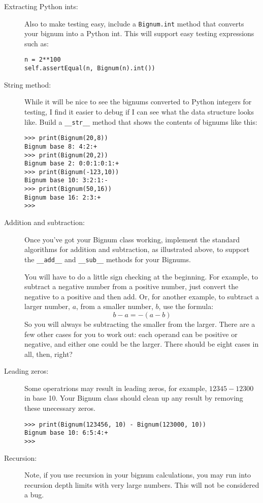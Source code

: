 \documentclass{article}
\begin{document}
\begin{description}
\item[Extracting Python ints:]
Also to make testing easy, include a \lstinline{Bignum.int} method that
converts your bignum into a Python int.  This will support easy testing
expressions such as:
\begin{lstlisting}
n = 2**100
self.assertEqual(n, Bignum(n).int())
\end{lstlisting}

\item[String method:]
While it will be nice to see the bignums converted to Python integers for 
testing, 
I find it easier to debug if I can see what the data structure looks like.
Build a \lstinline{__str__} method that shows the contents of bignums like this:
\begin{lstlisting}
>>> print(Bignum(20,8))
Bignum base 8: 4:2:+
>>> print(Bignum(20,2))
Bignum base 2: 0:0:1:0:1:+
>>> print(Bignum(-123,10))
Bignum base 10: 3:2:1:-
>>> print(Bignum(50,16))
Bignum base 16: 2:3:+
>>> 
\end{lstlisting}

\item[Addition and subtraction:]  Once you've got your Bignum class
working, 
implement the standard algorithms for addition and subtraction, as illustrated
above, to support the \lstinline{__add__} and \lstinline{__sub__} methods
for your Bignums.  

You will have to do a little sign checking at the beginning.  For example,
to subtract a negative number from a positive number, just convert the negative
to a positive and then add.  Or, for another example, 
to subtract a larger number, $a$, from a smaller number, $b$, use the formula:
\[
b - a = -(a - b)
\]
So you will always be subtracting the smaller from the larger.   There are a few
other cases for you to work out: each operand can be positive or negative,
and either one could be the larger.  There should be eight cases in all, then, right?

\item[Leading zeros:]  Some operatrions may result in leading zeros, for example,
$12345 - 12300$ in base 10.  Your Bignum class should clean up any result
by removing these unecessary zeros.

\begin{lstlisting}
>>> print(Bignum(123456, 10) - Bignum(123000, 10))
Bignum base 10: 6:5:4:+
>>> 
\end{lstlisting}


\item[Recursion:]  Note, if you use recursion in your bignum calculations,
you may run into recursion depth limits with very large numbers.
This will not be considered a bug.


\end{description}
\end{document}
